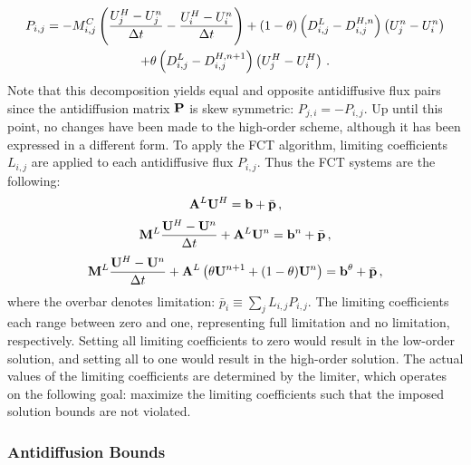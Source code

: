 \begin{multline}
  P_{i,j} = -M^C_{i,j}\pr{\frac{U^H_j - U^n_j}{\dt} - \frac{U^H_i - U^n_i}{\dt}}
    + (1-\theta)\pr{D^L_{i,j} - D^{H,n}_{i,j}}\pr{U^n_j - U^n_i}\\
    + \theta\pr{D^L_{i,j} - D^{H,n+1}_{i,j}}\pr{U^H_j - U^H_i} \eqp
\end{multline}
Note that this decomposition yields equal and opposite antidiffusive flux pairs
since the antidiffusion matrix $\P$ is skew symmetric: $P_{j,i}=-P_{i,j}$.
Up until this point, no changes have been made to the
high-order scheme, although it has been expressed in a different form.
To apply the FCT algorithm, limiting coefficients $L_{i,j}$ are applied to
each antidiffusive flux $P_{i,j}$. Thus the FCT systems are the following:
\begin{equation}\label{eq:fct_ss}
  \A^L \U^H = \ssrhs + \bar{\p} \eqc
\end{equation}
\begin{equation}\label{eq:fct_fe}
  \M^L\frac{\U^H - \U^n}{\dt} + \A^L\U^n = \ssrhs^n + \bar{\p} \eqc
\end{equation}
\begin{equation}\label{eq:fct_theta}
  \M^L\frac{\U^H - \U^n}{\dt} + \A^L\pr{\theta\U^{n+1} + (1-\theta)\U^n}
    = \ssrhs^\theta + \bar{\p} \eqc
\end{equation}
where the overbar denotes limitation: $\bar{p}_i\equiv\sum_j L_{i,j}P_{i,j}$.
The limiting coefficients each range between zero and one, representing
full limitation and no limitation, respectively. Setting all limiting
coefficients to zero would result in the low-order solution, and setting
all to one would result in the high-order solution. The actual values of the
limiting coefficients are determined by the limiter, which operates on the
following goal: maximize the limiting coefficients such that the imposed
solution bounds are not violated.



\subsubsection{Antidiffusion Bounds}

